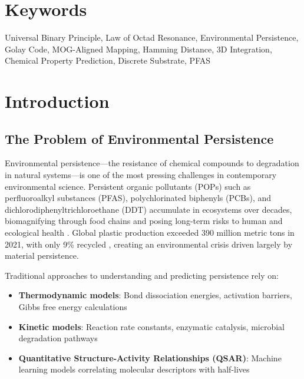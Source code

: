 \documentclass[11pt,letterpaper]{article}
\begin{document}
\section*{Keywords}
Universal Binary Principle, Law of Octad Resonance, Environmental Persistence, Golay Code, MOG-Aligned Mapping, Hamming Distance, 3D Integration, Chemical Property Prediction, Discrete Substrate, PFAS

\newpage
\tableofcontents
\newpage

\section{Introduction}

\subsection{The Problem of Environmental Persistence}

Environmental persistence—the resistance of chemical compounds to degradation in natural systems—is one of the most pressing challenges in contemporary environmental science. Persistent organic pollutants (POPs) such as perfluoroalkyl substances (PFAS), polychlorinated biphenyls (PCBs), and dichlorodiphenyltrichloroethane (DDT) accumulate in ecosystems over decades, biomagnifying through food chains and posing long-term risks to human and ecological health \cite{jones1999persistent, schwarzenbach2003challenge}. Global plastic production exceeded 390 million metric tons in 2021, with only 9\% recycled \cite{OECD2022, PlasticsEurope2022}, creating an environmental crisis driven largely by material persistence.

Traditional approaches to understanding and predicting persistence rely on:
\begin{itemize}
    \item \textbf{Thermodynamic models}: Bond dissociation energies, activation barriers, Gibbs free energy calculations
    \item \textbf{Kinetic models}: Reaction rate constants, enzymatic catalysis, microbial degradation pathways
    \item \textbf{Quantitative Structure-Activity Relationships (QSAR)}: Machine learning models correlating molecular descriptors with half-lives \cite{QSARBiodeg2024, Cassani2013}
\end{itemize}
\end{document}
